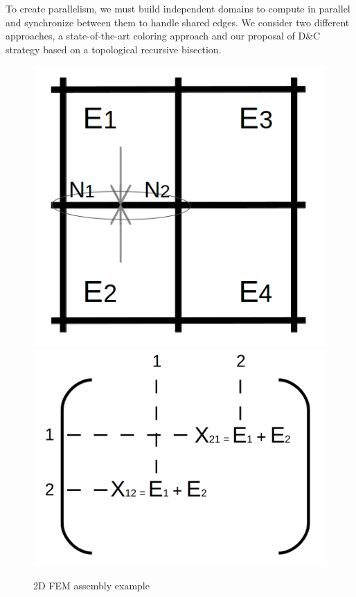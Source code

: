 \documentclass{IOS-Book-Article}
\begin{document}
To create parallelism, we must build independent domains to compute in parallel and synchronize between them to handle shared edges.
We consider two different approaches, a state-of-the-art coloring approach and our proposal of D\&C strategy based on a topological recursive bisection.
\begin{figure}[htp]
 \centering
 \includegraphics[scale=0.2]{2D_asm.png}
 \includegraphics[scale=0.12]{Matrix_asm.png}
 \caption{2D FEM assembly example}
 \label{fig:2Dasm}
\end{figure}
\end{document}
